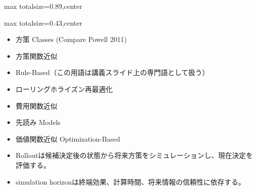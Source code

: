 \begin{minipage}[t]{0.58\textwidth}
\begin{adjustbox}{max totalsize={\textwidth}{0.89\textheight},center}
\begin{minipage}{\textwidth}
\end{minipage}
\end{adjustbox}
\end{minipage}


\clearpage
{}
\begin{minipage}[t]{0.405\textwidth}
\begin{adjustbox}{max totalsize={\textwidth}{0.43\textheight},center}
\begin{minipage}{\textwidth}\scriptsize
{}\begin{itemize}
\item 方策 Classes (Compare Powell 2011)
\item 方策関数近似
\item Rule-Based（この用語は講義スライド上の専門語として扱う）
\item ローリングホライズン再最適化
\item 費用関数近似
\item 先読み Models
\item 価値関数近似 Optimization-Based
\end{itemize}\begin{itemize}
\item Rolloutは候補決定後の状態から将来方策をシミュレーションし、現在決定を評価する。
\item simulation horizonは終端効果、計算時間、将来情報の信頼性に依存する。
\end{itemize}
\end{minipage}
\end{adjustbox}
\end{minipage}\hfill
